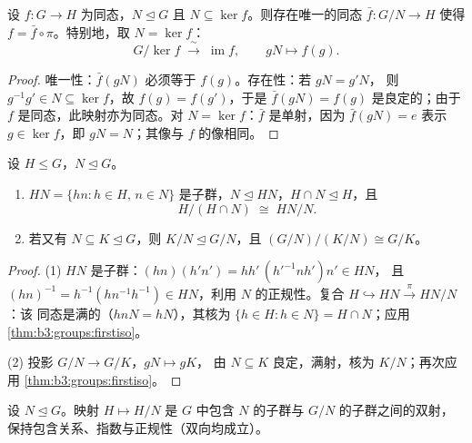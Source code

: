 \begin{theorem}
\label{thm:b3:groups:firstiso}
设 $f \colon G \to H$ 为同态，$N \trianglelefteq G$ 且
$N \subseteq \ker f$。则存在唯一的同态 $\bar f \colon G/N
\to H$ 使得 $f = \bar f \circ \pi$。特别地，取 $N = \ker
f$：
\[
G/\ker f \;\xrightarrow{\;\sim\;}\; \operatorname{im} f,
\qquad gN \mapsto f(g).
\]
\end{theorem}

\begin{proof}
唯一性：$\bar f(gN)$ 必须等于 $f(g)$。存在性：若 $gN = g'N$，
则 $g^{-1}g' \in N \subseteq \ker f$，故 $f(g) = f(g')$，于是 $\bar
f(gN) = f(g)$ 是良定的；由于 $f$ 是同态，此映射亦为同态。对
$N = \ker f$：$\bar f$ 是单射，因为 $\bar f(gN) = e$ 表示
$g \in \ker f$，即 $gN = N$；其像与 $f$ 的像相同。
\end{proof}

\begin{theorem}[第二、第三同构定理]
\label{thm:b3:groups:secondiso}
设 $H \leq G$，$N \trianglelefteq G$。
\begin{enumerate}
  \item $HN = \{hn : h \in H,\, n \in N\}$ 是子群，$N
        \trianglelefteq HN$，$H \cap N \trianglelefteq H$，且
        \[
        H/(H \cap N) \;\cong\; HN/N .
        \]
  \item 若又有 $N \subseteq K \trianglelefteq G$，则 $K/N
        \trianglelefteq G/N$，且 $(G/N)\big/(K/N) \cong G/K$。
\end{enumerate}
\end{theorem}

\begin{proof}
(1) $HN$ 是子群：$(hn)(h'n') = hh'\,(h'^{-1}nh')n' \in HN$，
且 $(hn)^{-1} = h^{-1}(hn^{-1}h^{-1}) \in HN$，利用
$N$ 的正规性。复合 $H \hookrightarrow HN \xrightarrow{\pi} HN/N$：该
同态是满的（$hnN = hN$），其核为 $\{h \in H : h \in
N\} = H \cap N$；应用\cref{thm:b3:groups:firstiso}。

(2) 投影 $G/N \to G/K$，$gN \mapsto gK$，
由 $N \subseteq K$ 良定，满射，核为 $K/N$；再次应用
\cref{thm:b3:groups:firstiso}。
\end{proof}

\begin{theorem}[对应定理]\label{thm:b3:groups:correspondence}
设 $N \trianglelefteq G$。映射 $H \mapsto H/N$ 是
$G$ 中包含 $N$ 的子群与 $G/N$ 的子群之间的双射，
保持包含关系、指数与正规性（双向均成立）。
\end{theorem}

